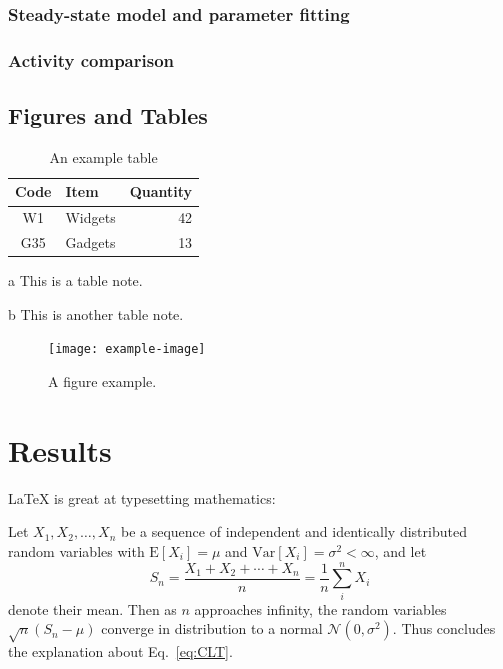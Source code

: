 \documentclass{biophys-new}
\begin{document}
\subsubsection{Steady-state model and parameter fitting}

\subsubsection{Activity comparison }

\subsection*{Figures and Tables}



\begin{table}[hbt!]
\caption{An example table}
\label{tab:widgets}
\centering

\begin{threeparttable}

\begin{tabular}{c l r}
\hline
Code & Item & Quantity \\\hline
W1 & Widgets\tnote{a} & 42 \\
G35 & Gadgets & 13\tnote{b} \\
\hline
\end{tabular}

\begin{tablenotes}
\item[a] This is a table note.
\item[b] This is another table note.
\end{tablenotes}

\end{threeparttable}

\end{table}

\begin{figure}[hbt!]
\centering
\texttt{[image: example-image]}
\caption{A figure example.}
\label{fig:view}

\end{figure}

\section*{Results}

\LaTeX{} is great at typesetting mathematics:

Let $X_1, X_2, \ldots, X_n$ be a sequence of independent and identically distributed random variables with $\text{E}[X_i] = \mu$ and $\text{Var}[X_i] = \sigma^2 < \infty$, and let
\begin{equation}
\label{eq:CLT}
S_n = \frac{X_1 + X_2 + \cdots + X_n}{n}
      = \frac{1}{n}\sum_{i}^{n} X_i
\end{equation}
denote their mean. Then as $n$ approaches infinity, the random variables $\sqrt{n}(S_n - \mu)$ converge in distribution to a normal $\mathcal{N}(0, \sigma^2)$. Thus concludes the explanation about Eq.~\ref{eq:CLT}.
\end{document}
